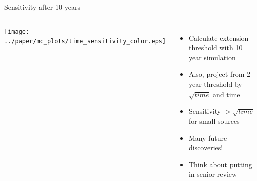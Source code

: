 \documentclass[12pt]{beamer}
\begin{document}
\begin{frame}{Sensitivity after 10 years}
  \begin{columns}
  \texttt{[image: ../paper/mc\_plots/time\_sensitivity\_color.eps]}
    \begin{itemize}
      \item Calculate extension threshold with 10 year simulation
      \item Also, project from 2 year threshold by $\sqrt{time}$ and time
      \item Sensitivity $>\sqrt{time}$ for small sources
      \item Many future discoveries!
      \item Think about putting in senior review
    \end{itemize}
  \end{columns}
\end{frame}
\end{document}
